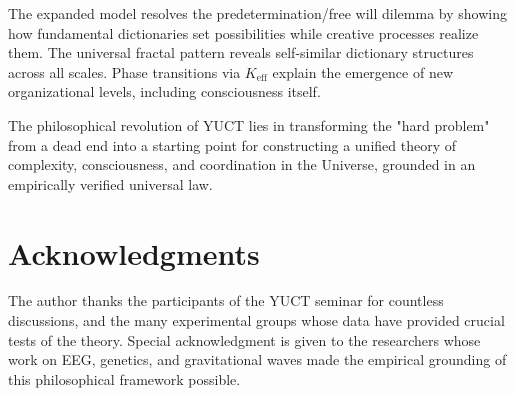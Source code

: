 \documentclass[12pt,a4paper]{article}
\newcommand{\eff}{\mathrm{eff}}
\newcommand{\Ke}{K_{\eff}}
\begin{document}
	The expanded model resolves the predetermination/free will dilemma by showing how fundamental dictionaries set possibilities while creative processes realize them. The universal fractal pattern reveals self-similar dictionary structures across all scales. Phase transitions via $\Ke$ explain the emergence of new organizational levels, including consciousness itself.
	
	The philosophical revolution of YUCT lies in transforming the "hard problem" from a dead end into a starting point for constructing a unified theory of complexity, consciousness, and coordination in the Universe, grounded in an empirically verified universal law.
	
	\section*{Acknowledgments}
	
	The author thanks the participants of the YUCT seminar for countless discussions, and the many experimental groups whose data have provided crucial tests of the theory. Special acknowledgment is given to the researchers whose work on EEG, genetics, and gravitational waves made the empirical grounding of this philosophical framework possible.
	
\end{document}
